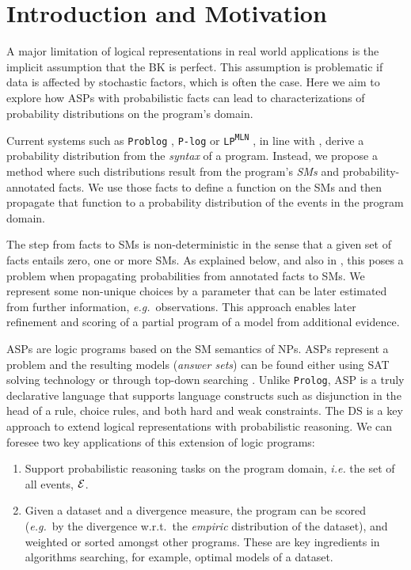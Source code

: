 \documentclass{tlp}
\renewcommand{\cite}{\citep}
\newcommand{\cla}[1]{\ensuremath{{\cal #1}}}        %
\newcommand{\EVENTSset}{\ensuremath{\cla{E}}}
\newcommand{\lpmln}{\texttt{LP\textsuperscript{MLN}}}
\begin{document}
\section{Introduction and Motivation}

A major limitation of logical representations in real world
applications is the implicit assumption that the \acl{BK} is perfect.
This assumption is problematic if data is affected by stochastic
factors, which is often the case.  Here we aim to explore how
\aclp{ASP} with probabilistic facts can lead to characterizations of
probability distributions on the program's domain.

Current systems such as \texttt{Problog} \cite{de2007problog},
\texttt{P-log} \cite{baral2009probabilistic} or \lpmln
\cite{lee2016weighted}, in line with \cite{kifer1992theory}, derive a
probability distribution from the \textit{syntax} of a program.
%
Instead, we propose a method where such distributions result from the
program's \textit{\acp{SM}} and probability-annotated facts.  We use
those facts to define a function on the \acp{SM} and then propagate
that function to a probability distribution of the events in the
program domain.

The step from facts to \aclp{SM} is non-deterministic in the sense
that a given set of facts entails zero, one or more \acp{SM}.  As
explained below, and also in
\cite{verreet2022inference,pajunen2021solution,cozman2020joy,baral2009probabilistic},
this poses a problem when propagating probabilities from annotated
facts to \aclp{SM}.
%
We represent some non-unique choices by a parameter that can be later
estimated from further information, \emph{e.g.}\ observations.  This
approach enables later refinement and scoring of a partial program of
a model from additional evidence.

\Acp{ASP} \cite{lifschitz2002answer,lifschitz2008twelve} are logic
programs based on the \acl{SM} semantics of \acp{NP}.  \Acp{ASP}
represent a problem and the resulting models (\emph{answer sets}) can
be found either using SAT solving technology
\cite{gebser2011potassco,adrian2018asp,niemela1997smodels} or through
top-down searching
\cite{alberti2017cplint,arias2020justifications,marple2017computing}.
Unlike \texttt{Prolog}, \ac{ASP} is a truly declarative language that
supports language constructs such as disjunction in the head of a
rule, choice rules, and both hard and weak constraints.
%
The \ac{DS} \cite{sato1995statistical,riguzzi2022foundations} is a key
approach to extend logical representations with probabilistic
reasoning.  We can foresee two key applications of this extension of
logic programs:
%
\begin{enumerate}
\item Support probabilistic reasoning tasks on the program domain,
  \textit{i.e.} the set of all events, \(\EVENTSset\).
\item Given a dataset and a divergence measure, the program can be
  scored (\textit{e.g.}\ by the divergence w.r.t.\ the \emph{empiric}
  distribution of the dataset), and weighted or sorted amongst other
  programs.  These are key ingredients in algorithms searching, for
  example, optimal models of a dataset.
\end{enumerate}
\end{document}
